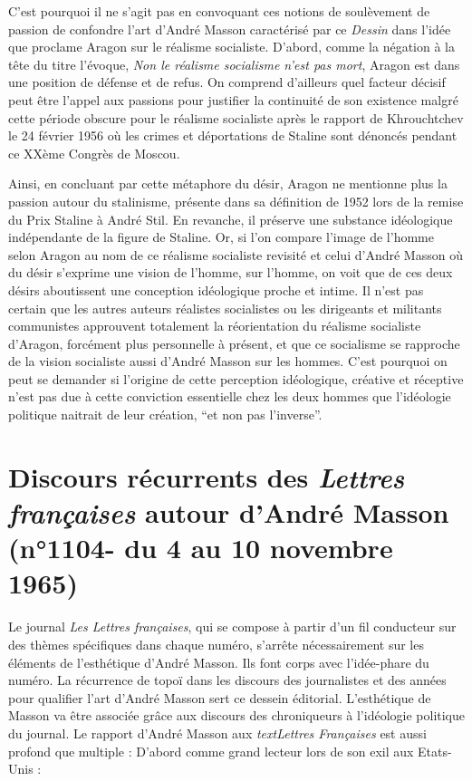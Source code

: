 {C’est pourquoi il ne s’agit pas en convoquant ces notions de soulèvement de passion de confondre l’art d’André Masson caractérisé par ce \emph{Dessin} dans l’idée que proclame Aragon sur le réalisme socialiste. D’abord, comme la négation à la tête du titre l’évoque, \emph{Non le réalisme socialisme n’est pas mort}, Aragon est dans une position de défense et de refus. On comprend d’ailleurs quel facteur décisif peut être l’appel aux passions pour justifier la continuité de son existence malgré cette période obscure pour le réalisme socialiste après le rapport de Khrouchtchev le 24 février 1956 où les crimes et déportations de Staline sont dénoncés pendant ce XXème Congrès de Moscou. 


	 Ainsi, en concluant par cette métaphore du désir, Aragon ne mentionne plus la passion autour du stalinisme, présente dans sa définition de 1952 lors de la remise du Prix Staline à André Stil. En revanche, il préserve une substance idéologique indépendante de la figure de Staline. Or, si l’on compare l’image de l’homme selon Aragon au nom de ce réalisme socialiste revisité et celui d’André Masson où du désir s’exprime une vision de l’homme, sur l’homme, on voit que de ces deux désirs aboutissent une conception idéologique proche et intime. Il n’est pas certain que les autres auteurs réalistes socialistes ou les dirigeants et militants communistes approuvent totalement la réorientation du réalisme socialiste d’Aragon, forcément plus personnelle à présent, et que ce socialisme se rapproche de la vision socialiste aussi d’André Masson sur les hommes. C’est pourquoi on peut se demander si l’origine de cette perception idéologique, créative et réceptive n’est pas due à cette conviction essentielle chez les deux hommes que l’idéologie politique naitrait de leur création, \enquote{et non pas l’inverse}. 

\section{Discours récurrents des \emph{Lettres françaises} autour d’André Masson (n°1104- du 4 au 10 novembre 1965)}  


Le journal \emph{Les Lettres françaises}, qui se compose à partir d’un fil conducteur sur des thèmes spécifiques dans chaque numéro, s’arrête nécessairement sur les éléments de l’esthétique d’André Masson.  Ils font corps avec l’idée-phare du numéro.  La récurrence de topoï dans les discours des journalistes et des années pour qualifier l’art d’André Masson sert ce dessein éditorial. L’esthétique de Masson va être associée grâce aux discours des chroniqueurs à l’idéologie politique du journal. Le rapport d’André Masson aux \emph{textLettres Françaises} est aussi profond que multiple : D’abord comme grand lecteur lors de son exil aux Etats-Unis : 

}
